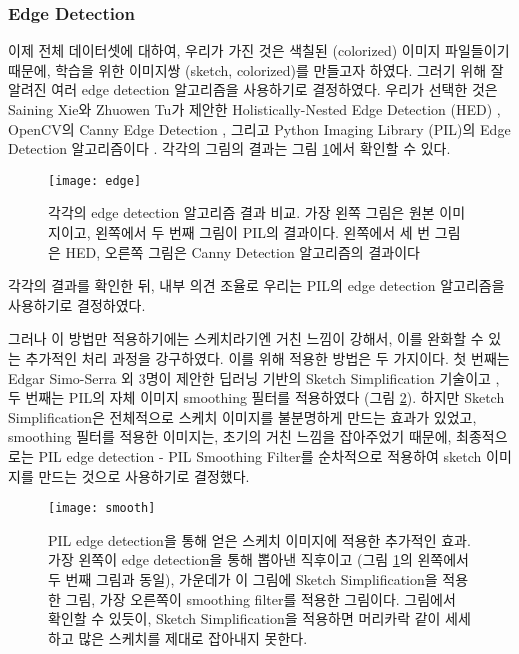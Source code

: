 \subsubsection{Edge Detection}

이제 전체 데이터셋에 대하여, 우리가 가진 것은 색칠된 (colorized) 이미지 파일들이기 때문에, 학습을 위한 이미지쌍 (sketch, colorized)를 만들고자 하였다. 그러기 위해 잘 알려진 여러 edge detection 알고리즘을 사용하기로 결정하였다.
우리가 선택한 것은 Saining Xie와 Zhuowen Tu가 제안한 Holistically-Nested Edge Detection (HED) \cite{Saining2015}, OpenCV의 Canny Edge Detection \cite{opencv}, 그리고 Python Imaging Library (PIL)의 Edge Detection 알고리즘이다 \cite{pillow}. 각각의 그림의 결과는 그림 \ref{fig:edge_detection}에서 확인할 수 있다.
\begin{figure}[t]
	\centering
	\texttt{[image: edge]}
	\caption{각각의 edge detection 알고리즘 결과 비교. 가장 왼쪽 그림은 원본 이미지이고, 왼쪽에서 두 번째 그림이 PIL의 결과이다. 왼쪽에서 세 번 그림은 HED, 오른쪽 그림은 Canny Detection 알고리즘의 결과이다}
	\label{fig:edge_detection}
\end{figure}
각각의 결과를 확인한 뒤, 내부 의견 조율로 우리는 PIL의 edge detection 알고리즘을 사용하기로 결정하였다. 

그러나 이 방법만 적용하기에는 스케치라기엔 거친 느낌이 강해서, 이를 완화할 수 있는 추가적인 처리 과정을 강구하였다.
이를 위해 적용한 방법은 두 가지이다.
첫 번째는 Edgar Simo-Serra 외 3명이 제안한 딥러닝 기반의 Sketch Simplification 기술이고 \cite{SimoSerraTOG2018}, 두 번째는 PIL의 자체 이미지 smoothing 필터를 적용하였다 (그림 \ref{fig:edge_smooth}).
하지만 Sketch Simplification은 전체적으로 스케치 이미지를 불분명하게 만드는 효과가 있었고, smoothing 필터를 적용한 이미지는, 초기의 거친 느낌을 잡아주었기 때문에, 최종적으로는 PIL edge detection - PIL Smoothing Filter를 순차적으로 적용하여 sketch 이미지를 만드는 것으로 사용하기로 결정했다.
\begin{figure}[t]
	\centering
	\texttt{[image: smooth]}
	\caption{PIL edge detection을 통해 얻은 스케치 이미지에 적용한 추가적인 효과. 가장 왼쪽이 edge detection을 통해 뽑아낸 직후이고 (그림 \ref{fig:edge_detection}의 왼쪽에서 두 번째 그림과 동일), 가운데가 이 그림에 Sketch Simplification을 적용한 그림, 가장 오른쪽이 smoothing filter를 적용한 그림이다. 그림에서 확인할 수 있듯이, Sketch Simplification을 적용하면 머리카락 같이 세세하고 많은 스케치를 제대로 잡아내지 못한다.}
	\label{fig:edge_smooth}
\end{figure}

